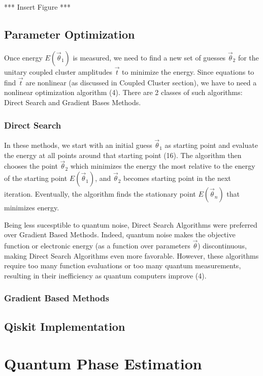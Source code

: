 \documentclass{article}
\begin{document}
    *** Insert Figure ***

  \subsection{Parameter Optimization}
  Once energy \(E(\vec{\theta}_1)\) is measured, we need to find a new set
  of guesses \(\vec{\theta}_2\) for the unitary coupled cluster amplitudes
  \(\vec{t}\) to minimize the energy. Since equations to find \(\vec{t}\)
  are nonlinear (as discussed in Coupled Cluster section), we have to need
  a nonlinear optimization algorithm (4). There are 2 classes of such algorithms:
  Direct Search and Gradient Bases Methods.
    \subsubsection{Direct Search}
    In these methods, we start with an initial guess \(\vec{\theta}_1\)
    as starting point and evaluate the energy at all points around that
    starting point (16). The algorithm then chooses the point \(\vec{\theta}_2\) which
    minimizes the energy the most relative to the energy of the starting
    point \(E(\vec{\theta}_1)\), and \(\vec{\theta}_2\) becomes starting
    point in the next iteration. Eventually, the algorithm finds the
    stationary point \(E(\vec{\theta}_n)\) that minimizes energy.

    Being less sucesptible to quantum noise, Direct Search Algorithms were
    preferred over Gradient Based Methods. Indeed, quantum noise makes the
    objective function or electronic energy (as a function over parameters
    \(\vec{\theta}\)) discontinuous, making Direct Search Algorithms even
    more favorable. However, these algorithms require too many function
    evaluations or too many quantum measurements, resulting in their
    inefficiency as quantum computers improve (4).
    \subsubsection{Gradient Based Methods}

  \subsection{Qiskit Implementation}
\section{Quantum Phase Estimation}
\end{document}
